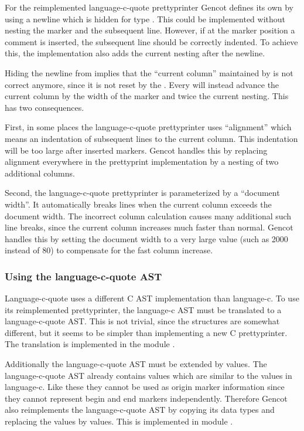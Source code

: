 For the reimplemented language-c-quote prettyprinter Gencot defines its own  by using a newline 
which is hidden for type . This could be implemented without nesting the marker and the subsequent line.
However, if at the marker position a comment is inserted, the subsequent line should be correctly indented.
To achieve this, the  implementation also adds the current nesting after the newline.

Hiding the newline from  implies that the ``current column'' maintained by  is not
correct anymore, since it is not reset by the . Every  will instead advance the current
column by the width of the marker and twice the current nesting. This has two consequences.

First, in some places the language-c-quote prettyprinter uses ``alignment'' which means an indentation of subsequent lines
to the current column. This indentation will be too large after inserted markers. Gencot handles this by replacing 
alignment everywhere in the prettyprint implementation by a nesting of two additional columns. 

Second, the language-c-quote prettyprinter is parameterized by a ``document width''. It automatically breaks lines 
when the current column exceeds the document width. The incorrect column calculation causes many additional such
line breaks, since the current column increases much faster than normal. Gencot handles this by setting the document
width to a very large value (such as 2000 instead of 80) to compensate for the fast column increase.

\subsubsection{Using the language-c-quote AST}

Language-c-quote uses a different C AST implementation than language-c. To use its reimplemented prettyprinter, the 
language-c AST must be translated to a language-c-quote AST. This is not trivial, since the structures are somewhat
different, but it seems to be simpler than implementing a new C prettyprinter. The translation is implemented in
the module . 

Additionally the language-c-quote AST must be extended by  values. The language-c-quote AST already 
contains  values which are similar to the  values in language-c. Like these they cannot
be used as origin marker information since they cannot represent begin and end markers independently. Therefore
Gencot also reimplements the language-c-quote AST by copying its data types and replacing the 
values by  values. This is implemented in module .

